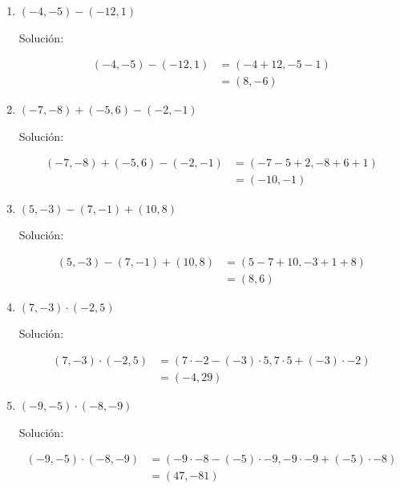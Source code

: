 \documentclass{article}
\theoremstyle{definition}
\begin{document}
\begin{enumerate}
\begin{enumerate}
            \item $(-4, -5) - (-12, 1)$
            \begin{center}
                Solución:
            \end{center}
            \begin{align*}
                (-4, -5) - (-12, 1) &= (-4+12, -5-1) \\
                &= \boxed{(8, -6)}
            \end{align*}
            \item $(-7, -8) + (-5, 6) - (-2, -1)$
            \begin{center}
                Solución:
            \end{center}
            \begin{align*}
                (-7, -8) + (-5, 6) - (-2, -1) &= (-7-5+2, -8+6+1) \\
                &= \boxed{(-10, -1)}
            \end{align*}
            \item $(5, -3) - (7, -1) + (10, 8)$
            \begin{center}
                Solución:
            \end{center}
            \begin{align*}
                (5, -3) - (7, -1) + (10, 8) &= (5-7+10, -3+1+8) \\
                &= \boxed{(8, 6)}
            \end{align*}
            \item $(7, -3) \cdotp (-2, 5)$
            \begin{center}
                Solución:
            \end{center}
            \begin{align*}
                (7, -3) \cdotp (-2, 5) &= (7 \cdotp -2 - (-3) \cdotp 5, 7 \cdotp 5 + (-3) \cdotp -2) \\
                &= \boxed{(-4, 29)}
            \end{align*}
            \item $(-9, -5) \cdotp (-8, -9)$
            \begin{center}
                Solución:
            \end{center}
            \begin{align*}
                (-9, -5) \cdotp (-8, -9) &= (-9 \cdotp -8 - (-5) \cdotp -9, -9 \cdotp -9 + (-5) \cdotp -8) \\
                &= \boxed{(47, -81)}
            \end{align*}

\end{enumerate}
\end{enumerate}
\end{document}
